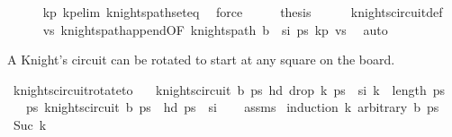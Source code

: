 \begin{isabellebody}
\ \ \ \ \isamarkupfalse%
\ kp{}\ kp{\isacharunderscore}{\kern0pt}elim\ knights{\isacharunderscore}{\kern0pt}path{\isacharunderscore}{\kern0pt}set{\isacharunderscore}{\kern0pt}eq\ \isamarkupfalse%
\ force\isanewline
\ \ \isamarkupfalse%
\ \isamarkupfalse%
\ {\isacharquery}{\kern0pt}thesis\isanewline
\ \ \ \ \isamarkupfalse%
\ knights{\isacharunderscore}{\kern0pt}circuit{\isacharunderscore}{\kern0pt}def\isanewline
\ \ \ \ \isamarkupfalse%
\ vs\ knights{\isacharunderscore}{\kern0pt}path{\isacharunderscore}{\kern0pt}append{\isacharbrackleft}{\kern0pt}OF\ {\isacartoucheopen}knights{\isacharunderscore}{\kern0pt}path\ {\isacharparenleft}{\kern0pt}b\ {\isacharminus}{\kern0pt}\ {\isacharbraceleft}{\kern0pt}s\isactrlsub i{\isacharbraceright}{\kern0pt}{\isacharparenright}{\kern0pt}\ ps{\isacartoucheclose}\ kp{}{\isacharbrackright}{\kern0pt}\ vs{\isacharprime}{\kern0pt}\ \isamarkupfalse%
\ auto\isanewline
{}\isamarkupfalse%
%
\endisatagproof
{\isafoldproof}%
%
\isadelimproof
%
\endisadelimproof
%
\begin{isamarkuptext}%
A Knight's circuit can be rotated to start at any square on the board.%
\end{isamarkuptext}\isamarkuptrue%
\isamarkupfalse%
\ knights{\isacharunderscore}{\kern0pt}circuit{\isacharunderscore}{\kern0pt}rotate{\isacharunderscore}{\kern0pt}to{\isacharcolon}{\kern0pt}\isanewline
\ \ \ {\isachardoublequoteopen}knights{\isacharunderscore}{\kern0pt}circuit\ b\ ps{\isachardoublequoteclose}\ {\isachardoublequoteopen}hd\ {\isacharparenleft}{\kern0pt}drop\ k\ ps{\isacharparenright}{\kern0pt}\ {\isacharequal}{\kern0pt}\ s\isactrlsub i{\isachardoublequoteclose}\ {\isachardoublequoteopen}k\ {\isacharless}{\kern0pt}\ length\ ps{\isachardoublequoteclose}\isanewline
\ \ \ {\isachardoublequoteopen}{\isasymexists}ps{\isacharprime}{\kern0pt}{\isachardot}{\kern0pt}\ knights{\isacharunderscore}{\kern0pt}circuit\ b\ ps{\isacharprime}{\kern0pt}\ {\isasymand}\ hd\ ps{\isacharprime}{\kern0pt}\ {\isacharequal}{\kern0pt}\ s\isactrlsub i{\isachardoublequoteclose}\isanewline
%
\isadelimproof
\ \ %
\endisadelimproof
%
\isatagproof
{}\isamarkupfalse%
\ assms\isanewline
{}\isamarkupfalse%
\ {\isacharparenleft}{\kern0pt}induction\ k\ arbitrary{\isacharcolon}{\kern0pt}\ b\ ps{\isacharparenright}{\kern0pt}\isanewline
\ \ \isamarkupfalse%
\ {\isacharparenleft}{\kern0pt}Suc\ k{\isacharparenright}{\kern0pt}\isanewline

\end{isabellebody}
